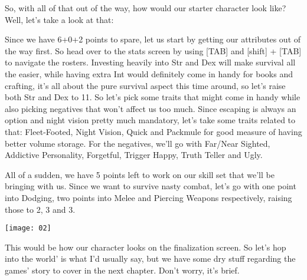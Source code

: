 So, with all of that out of the way, how would our starter character look like? Well, let's take a look at that:

Since we have 6+0+2 points to spare, let us start by getting our attributes out of the way first. So head over to the stats screen by using [TAB] and [shift] + [TAB] to navigate the rosters. Investing heavily into Str and Dex will make survival all the easier, while having extra Int would definitely come in handy for books and crafting, it's all about the pure survival aspect this time around, so let's raise both Str and Dex to 11. So let's pick some traits that might come in handy while also picking negatives that won't affect us too much. Since escaping is always an option and night vision pretty much mandatory, let's take some traits related to that: Fleet-Footed, Night Vision, Quick and Packmule for good measure of having better volume storage. For the negatives, we'll go with Far/Near Sighted, Addictive Personality, Forgetful, Trigger Happy, Truth Teller and Ugly.

All of a sudden, we have 5 points left to work on our skill set that we'll be bringing with us. Since we want to survive nasty combat, let's go with one point into Dodging, two points into Melee and Piercing Weapons respectively, raising those to 2, 3 and 3.

\texttt{[image: 02]}

This would be how our character looks on the finalization screen. So let's hop into the world' is what I'd usually say, but we have some dry stuff regarding the games' story to cover in the next chapter. Don't worry, it's brief.